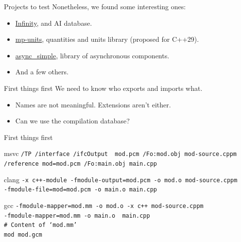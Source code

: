 \documentclass[]{beamer}
\begin{document}
\begin{frame}{Projects to test}
  Nonetheless, we found some interesting ones:
  \begin{itemize}
    \item \href{https://github.com/infiniflow/infinity}{Infinity}, and AI database.
    \item \href{https://github.com/mpusz/mp-units}{mp-units}, quantities and units library (proposed for C++29).
    \item \href{https://github.com/alibaba/async_simple/tree/CXX20Modules}{async\_simple}, library of asynchronous components.
    \item And a few others.
  \end{itemize}
\end{frame}

\begin{frame}{First things first}
  We need to know who exports and imports what.
  \begin{itemize}
    \item Names are not meaningful. Extensions aren't either.
    \item Can we use the compilation database?
  \end{itemize}
\end{frame}

\begin{frame}{First things first}
  \begin{block}{msvc }
    \footnotesize{
    \texttt{/TP /interface /ifcOutput {\color{red} mod.pcm} /Fo:mod.obj {\color{blue}mod-source.cppm}} \\
    \texttt{/reference {\color{purple}mod=mod.pcm} /Fo:main.obj {\color{blue}main.cpp}}
    }
  \end{block}
  \begin{block}{clang }
    \footnotesize{
    \texttt{-x c++-module -fmodule-output={\color{red}mod.pcm} -o mod.o {\color{blue}mod-source.cppm}} \\
    \texttt{-fmodule-file={\color{purple}mod=mod.pcm} -o main.o {\color{blue}main.cpp}}
    }
  \end{block}
  \begin{block}{gcc }
    \footnotesize{
    \texttt{-fmodule-mapper={\color{magenta}mod.mm} -o mod.o -x c++ {\color{blue}mod-source.cppm}} \\
    \texttt{-fmodule-mapper={\color{magenta}mod.mm} -o main.o {\color{blue} main.cpp}} \\
    {\color{teal}\texttt{\# Content of `mod.mm'}} \\
    \texttt{mod mod.gcm}
    }
  \end{block}
\end{frame}
\end{document}
